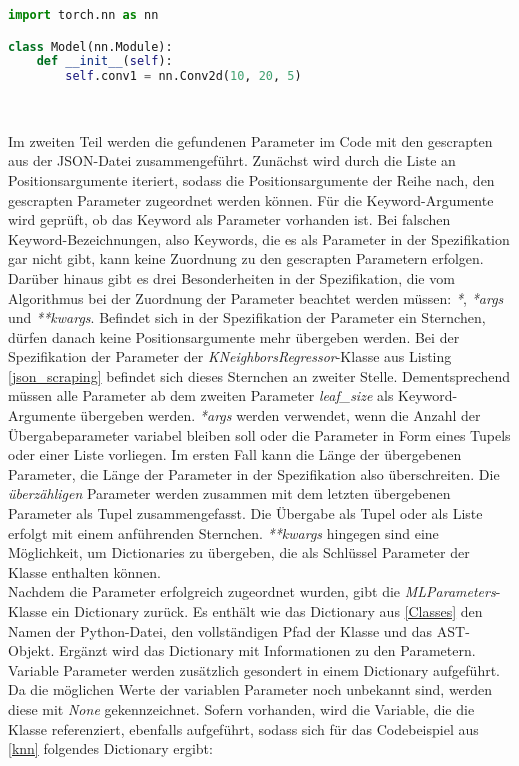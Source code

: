 \documentclass[german,bachelor]{swsLeipzig}
\begin{document}
\noindent\begin{minipage}{\linewidth}
\begin{lstlisting}[language=Python, frame=single, label=nn_module,  basicstyle=\small, caption={Vererbung der ML-Klasse Module aus PyTorch},captionpos=b]
import torch.nn as nn

class Model(nn.Module):
    def __init__(self):
        self.conv1 = nn.Conv2d(10, 20, 5)
\end{lstlisting}
\end{minipage}
\

\noindent Im zweiten Teil werden die gefundenen Parameter im Code mit den gescrapten aus der JSON-Datei zusammengeführt.
Zunächst wird durch die Liste an Positionsargumente iteriert, sodass die Positionsargumente der Reihe nach,
den gescrapten Parameter zugeordnet werden können.
Für die Keyword-Argumente wird geprüft, ob das Keyword als Parameter vorhanden ist.
Bei falschen Keyword-Bezeichnungen, also Keywords, die es als Parameter in der Spezifikation gar nicht gibt,
kann keine Zuordnung zu den gescrapten Parametern erfolgen. \\
\indent Darüber hinaus gibt es drei Besonderheiten in der Spezifikation, die vom Algorithmus bei der Zuordnung der Parameter
beachtet werden müssen: \textit{*}, \textit{*args} und \textit{**kwargs}.
Befindet sich in der Spezifikation der Parameter ein Sternchen, dürfen danach keine Positionsargumente mehr
übergeben werden.
Bei der Spezifikation der Parameter der \textit{KNeighborsRegressor}-Klasse aus Listing \ref{json_scraping} befindet 
sich dieses Sternchen an zweiter Stelle.
Dementsprechend müssen alle Parameter ab dem zweiten Parameter \textit{leaf\_size} als Keyword-Argumente übergeben werden.
\textit{*args} werden verwendet, wenn die Anzahl der Übergabeparameter variabel bleiben soll oder die Parameter in Form
eines Tupels oder einer Liste vorliegen.
Im ersten Fall kann die Länge der übergebenen Parameter, die Länge der Parameter in der Spezifikation also überschreiten.
Die \textit{überzähligen} Parameter werden zusammen mit dem letzten übergebenen Parameter als Tupel zusammengefasst.
Die Übergabe als Tupel oder als Liste erfolgt mit einem anführenden Sternchen.
\textit{**kwargs} hingegen sind eine Möglichkeit, um Dictionaries zu übergeben, die als Schlüssel Parameter der Klasse
enthalten können. \\

\noindent Nachdem die Parameter erfolgreich zugeordnet wurden, gibt die \textit{MLParameters}-Klasse ein Dictionary zurück.
Es enthält wie das Dictionary aus \ref{Classes} den Namen der Python-Datei, den vollständigen Pfad der Klasse und das AST-Objekt.
Ergänzt wird das Dictionary mit Informationen zu den Parametern.
Variable Parameter werden zusätzlich gesondert in einem Dictionary aufgeführt.
Da die möglichen Werte der variablen Parameter noch unbekannt sind, werden diese mit \textit{None} gekennzeichnet.
Sofern vorhanden, wird die Variable, die die Klasse referenziert, ebenfalls aufgeführt, sodass sich für das Codebeispiel
aus \ref{knn} folgendes Dictionary ergibt:\\
\end{document}
